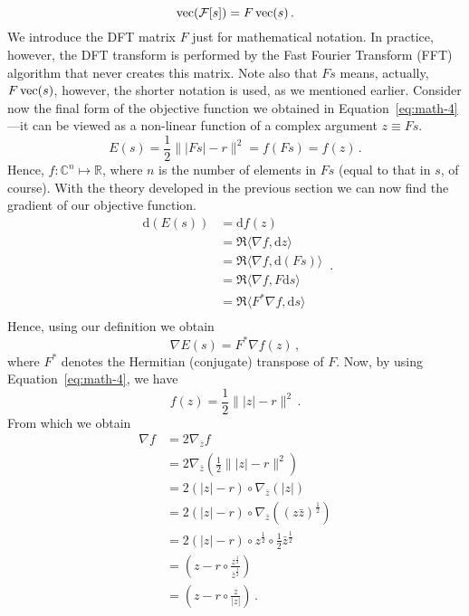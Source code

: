 \begin{equation}
  \label{eq:math-5}
  \operatorname*{\mathrm{vec}}(\mathcal{F}[s]) = F\operatorname*{\mathrm{vec}}(s) \,. 
\end{equation}
We introduce the DFT matrix $F$ just for mathematical notation. In
practice, however, the DFT transform is performed by the Fast Fourier
Transform (FFT) algorithm that never creates this matrix. Note also
that $Fs$ means, actually, $F\operatorname*{\mathrm{vec}}(s)$, however, the shorter notation
is used, as we mentioned earlier. Consider now the final form of the
objective function we obtained in Equation~\eqref{eq:math-4}---it can
be viewed as a non-linear function of a complex argument $z\equiv
Fs$.%
\begin{equation}
  \label{eq:math-6}
  E(s) = \frac{1}{2} \| |Fs| - r\|^{2} = f(Fs) = f(z)\,.
\end{equation}
Hence,  $f:\mathbb C^{n} \mapsto \mathbb R$, where $n$ is the number
of elements in $Fs$ (equal to that in $s$, of course).  With the
theory developed in the previous section we can now find the gradient of
our objective function.
\begin{equation}
  \label{eq:math-10}
  \begin{split}
    \mathrm{d} (E(s))
    & = \mathrm{d} f(z)\\
    & = \Re \langle \nabla f, \mathrm{d} z \rangle\\
    & = \Re \langle \nabla f, \mathrm{d}(Fs) \rangle\\
    & = \Re \langle \nabla f, F \mathrm{d} s \rangle\\
    & = \Re \langle F^{*} \nabla f, \mathrm{d} s \rangle\\
  \end{split} \,. 
\end{equation}
Hence, using our definition we obtain
\begin{equation}
  \label{eq:math-11}
  \nabla E(s) = F^{*}\nabla f(z) \,,
\end{equation}
where $F^{*}$ denotes the Hermitian (conjugate) transpose of $F$. Now,
by using  Equation~\eqref{eq:math-4}, we have
\begin{equation}
  \label{eq:66}
  f(z) = \frac{1}{2} \| |z| - r\|^{2} \,.
\end{equation}
From which we obtain
\begin{equation}
  \label{eq:67}
  \begin{split}
    \nabla f
    & = 2 \nabla_{\bar z} f\\
    & = 2 \nabla_{\bar z} \left(\frac{1}{2} \| |z| - r\|^{2}\right)\\
    & = 2 (|z| - r) \circ \nabla_{\bar z} \left(|z|\right)\\
    & =  2 (|z| - r) \circ \nabla_{\bar z} \left((z\bar
      z)^{\frac{1}{2}}\right)\\
    & = 2 (|z| - r) \circ z^{\frac{1}{2}} \circ
    \frac{1}{2}\bar{z}^{\frac{1}{2}}\\
    & = \left(z - r\circ
      \frac{z^{\frac{1}{2}}}{\bar{z}^{\frac{1}{2}}}\right)\\
    & =
    \left(
      z - r\circ \frac{z}{|z|}
    \right) \,. 
  \end{split}
\end{equation}
